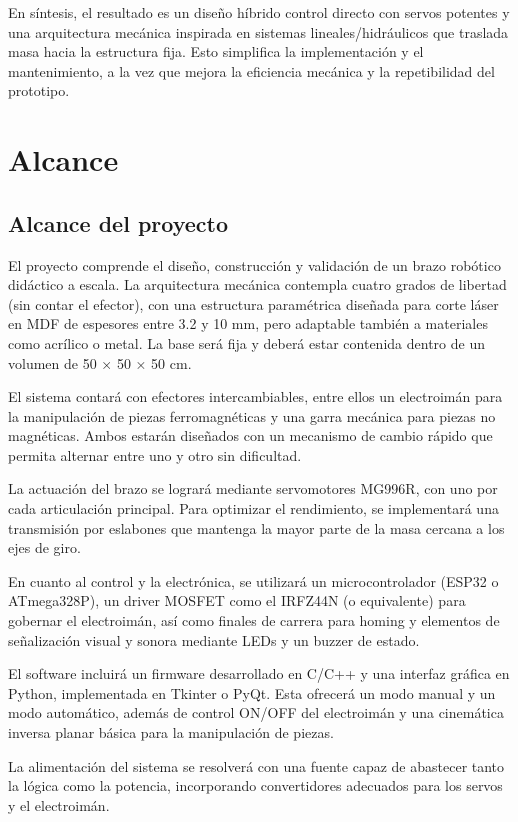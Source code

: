 En síntesis, el resultado es un diseño híbrido control directo con servos potentes y una arquitectura mecánica inspirada en sistemas lineales/hidráulicos que traslada masa hacia la estructura fija. 
Esto simplifica la implementación y el mantenimiento, a la vez que mejora la eficiencia mecánica y la repetibilidad del prototipo.

\newpage

\section{Alcance}

\subsection{Alcance del proyecto}
El proyecto comprende el diseño, construcción y validación de un brazo robótico didáctico a escala. La arquitectura mecánica contempla cuatro grados de libertad (sin contar el efector), con una estructura paramétrica diseñada para corte láser en MDF de espesores entre 3.2 y 10 mm, pero adaptable también a materiales como acrílico o metal. La base será fija y deberá estar contenida dentro de un volumen de 50 × 50 × 50 cm.

El sistema contará con efectores intercambiables, entre ellos un electroimán para la manipulación de piezas ferromagnéticas y una garra mecánica para piezas no magnéticas. Ambos estarán diseñados con un mecanismo de cambio rápido que permita alternar entre uno y otro sin dificultad.

La actuación del brazo se logrará mediante servomotores MG996R, con uno por cada articulación principal. Para optimizar el rendimiento, se implementará una transmisión por eslabones que mantenga la mayor parte de la masa cercana a los ejes de giro.

En cuanto al control y la electrónica, se utilizará un microcontrolador (ESP32 o ATmega328P), un driver MOSFET como el IRFZ44N (o equivalente) para gobernar el electroimán, así como finales de carrera para homing y elementos de señalización visual y sonora mediante LEDs y un buzzer de estado.

El software incluirá un firmware desarrollado en C/C++ y una interfaz gráfica en Python, implementada en Tkinter o PyQt. Esta ofrecerá un modo manual y un modo automático, además de control ON/OFF del electroimán y una cinemática inversa planar básica para la manipulación de piezas.

La alimentación del sistema se resolverá con una fuente capaz de abastecer tanto la lógica como la potencia, incorporando convertidores adecuados para los servos y el electroimán.

